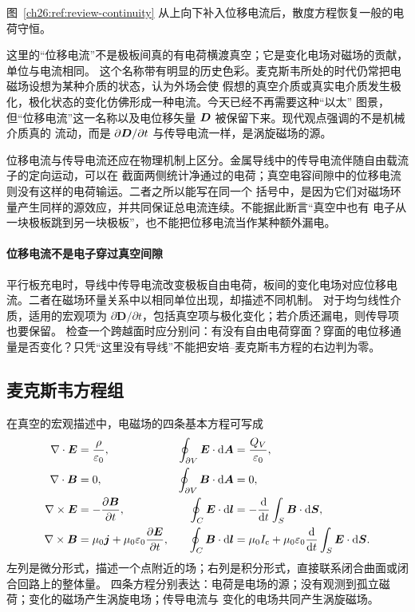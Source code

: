 {图~\ref{ch26:ref:review-continuity} 从上向下补入位移电流后，散度方程恢复一般的电荷守恒。

\continuityDiagram

这里的“位移电流”不是极板间真的有电荷横渡真空；它是变化电场对磁场的贡献，单位与电流相同。
这个名称带有明显的历史色彩。麦克斯韦所处的时代仍常把电磁场设想为某种介质的状态，认为外场会使
假想的真空介质或真实电介质发生极化，极化状态的变化仿佛形成一种电流。今天已经不再需要这种“以太”
图景，但“位移电流”这一名称以及电位移矢量 $\bm{D}$ 被保留下来。现代观点强调的不是机械介质真的
流动，而是 $\partial\bm{D}/\partial t$ 与传导电流一样，是涡旋磁场的源。

位移电流与传导电流还应在物理机制上区分。金属导线中的传导电流伴随自由载流子的定向运动，可以在
截面两侧统计净通过的电荷；真空电容间隙中的位移电流则没有这样的电荷输运。二者之所以能写在同一个
括号中，是因为它们对磁场环量产生同样的源效应，并共同保证总电流连续。不能据此断言“真空中也有
电子从一块极板跳到另一块极板”，也不能把位移电流当作某种额外漏电。


\paragraph{位移电流不是电子穿过真空间隙}
平行板充电时，导线中传导电流改变极板自由电荷，板间的变化电场对应位移电流。二者在磁场环量关系中以相同单位出现，却描述不同机制。
对于均匀线性介质，适用的宏观项为 $\partial\boldsymbol D/\partial t$，包括真空项与极化变化；若介质还漏电，则传导项也要保留。
检查一个跨越面时应分别问：有没有自由电荷穿面？穿面的电位移通量是否变化？只凭“这里没有导线”不能把安培--麦克斯韦方程的右边判为零。


\subsection{麦克斯韦方程组}


在真空的宏观描述中，电磁场的四条基本方程可写成
\begin{align}
  \nabla\cdot\vect E&=\frac{\rho}{\varepsilon_0},
  &\oint_{\partial V}\vect E\cdot\dd\vect A&=\frac{Q_V}{\varepsilon_0},
  \\
  \nabla\cdot\vect B&=0,
  &\oint_{\partial V}\vect B\cdot\dd\vect A&=0,
  \\
  \nabla\times\vect E&=-\frac{\partial\vect B}{\partial t},
  &\oint_C\vect E\cdot\dd\vect l&=-\frac{\dd}{\dd t}\int_S\vect B\cdot\dd\vect S,
  \\
  \nabla\times\vect B&=\mu_0\vect j+\mu_0\varepsilon_0
  \frac{\partial\vect E}{\partial t},
  &\oint_C\vect B\cdot\dd\vect l&=\mu_0 I_{\rm c}+\mu_0\varepsilon_0
  \frac{\dd}{\dd t}\int_S\vect E\cdot\dd\vect S.
\end{align}
左列是微分形式，描述一个点附近的场；右列是积分形式，直接联系闭合曲面或闭合回路上的整体量。
四条方程分别表达：电荷是电场的源；没有观测到孤立磁荷；变化的磁场产生涡旋电场；传导电流与
变化的电场共同产生涡旋磁场。

}
